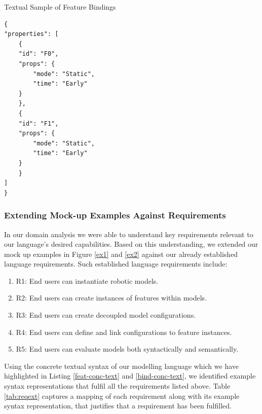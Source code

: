 \documentclass[conference]{IEEEtran}
\begin{document}
\begin{listing}
\caption{Textual Sample of Feature Bindings}
\begin{verbatim}
{
"properties": [
    {
    "id": "F0",
    "props": {
        "mode": "Static",
        "time": "Early"
    }
    },
    {
    "id": "F1",
    "props": {
        "mode": "Static",
        "time": "Early"
    }
    }
]
}
\end{verbatim}
\label{bind-conc-text}
\end{listing}

\subsubsection{Extending Mock-up Examples Against Requirements}
In our domain analysis we were able to understand key requirements relevant to our language's desired capabilities. Based on this understanding, we extended our mock up examples in Figure \ref{ex1} and \ref{ex2} against our already established language requirements. Such established language requirements include:
\begin{enumerate}
    \item R1: End users can instantiate robotic models.
    \item R2: End users can create instances of features within models.
    \item R3: End users can create decoupled model configurations.
    \item R4: End users can define and link configurations to feature instances.
    \item R5: End users can evaluate models both syntactically and semantically.
\end{enumerate}
Using the concrete textual syntax of our modelling language which we have highlighted in Listing \ref{feat-conc-text} and \ref{bind-conc-text}, we identified example syntax representations that fulfil all the requirements listed above. Table \ref{tab:reqext} captures a mapping of each requirement along with its example syntax representation, that justifies that a requirement has been fulfilled.
\end{document}
